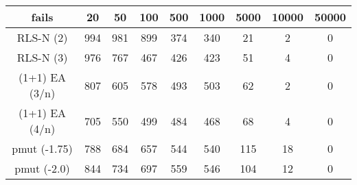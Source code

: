 \begin{tabular}[h]{ccccccccc}
fails&20&50&100&500&1000&5000&10000&50000\\\hline
RLS-N (2)&994&981&899&374&340&21&2&0\\
RLS-N (3)&976&767&467&426&423&51&4&0\\
(1+1) EA (3/n)&807&605&578&493&503&62&2&0\\
(1+1) EA (4/n)&705&550&499&484&468&68&4&0\\
pmut (-1.75)&788&684&657&544&540&115&18&0\\
pmut (-2.0)&844&734&697&559&546&104&12&0\\
\end{tabular}
